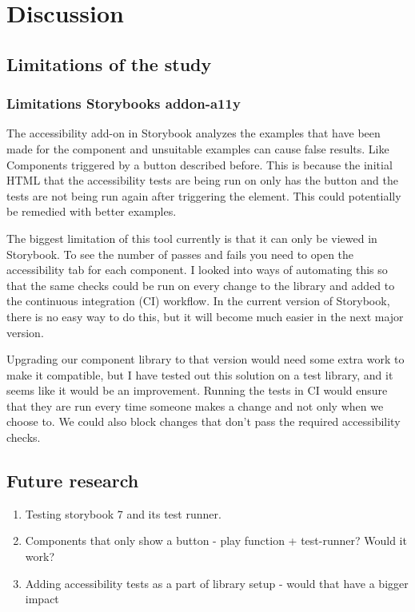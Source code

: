 \documentclass{master_thesis}
\begin{document}
\section{Discussion}

\subsection{Limitations of the study}
\subsubsection{Limitations Storybooks addon-a11y}

The accessibility add-on in Storybook analyzes the examples that have been made for the component and unsuitable examples can cause false results. Like Components triggered by a button described before. This is because the initial HTML that the accessibility tests are being run on only has the button and the tests are not being run again after triggering the element. This could potentially be remedied with better examples.

The biggest limitation of this tool currently is that it can only be viewed in Storybook. To see the number of passes and fails you need to open the accessibility tab for each component. I looked into ways of automating this so that the same checks could be run on every change to the library and added to the continuous integration (CI) workflow. In the current version of Storybook, there is no easy way to do this, but it will become much easier in the next major version.

Upgrading our component library to that version would need some extra work to make it compatible, but I have tested out this solution on a test library, and it seems like it would be an improvement. Running the tests in CI would ensure that they are run every time someone makes a change and not only when we choose to. We could also block changes that don't pass the required accessibility checks.


\subsection{Future research}

\begin{enumerate}
	\item Testing storybook 7 and its test runner.
	\item Components that only show a button - play function + test-runner? Would it work?
	\item Adding accessibility tests as a part of library setup - would that have a bigger impact
\end{enumerate}
\end{document}
